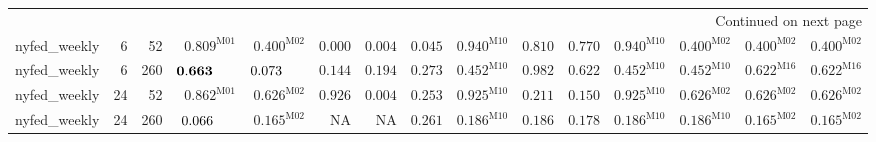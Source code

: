 \begin{longtable}{@{}lrrrrrrrrrrrrrr@{}}
\midrule
\endhead
\midrule\multicolumn{15}{r}{Continued on next page}\\\endfoot
\bottomrule\endlastfoot
nyfed\_weekly & 6 & 52 & $\mathbf{0.809}^{\mathrm{M01}}$ & $\mathbf{0.400}^{\mathrm{M02}}$ & $0.000$ & $0.004$ & $0.045$ & $\mathbf{0.940}^{\mathrm{M10}}$ & $\mathbf{0.810}$ & $\mathbf{0.770}$ & $\mathbf{0.940}^{\mathrm{M10}}$ & $\mathbf{0.400}^{\mathrm{M02}}$ & $\mathbf{0.400}^{\mathrm{M02}}$ & $\mathbf{0.400}^{\mathrm{M02}}$ \\
nyfed\_weekly & 6 & 260 & $\mathbf{0.663}\hphantom{^{\mathrm{M00}}}$ & $0.073\hphantom{^{\mathrm{M00}}}$ & $\mathbf{0.144}$ & $\mathbf{0.194}$ & $\mathbf{0.273}$ & $\mathbf{0.452}^{\mathrm{M10}}$ & $\mathbf{0.982}$ & $\mathbf{0.622}$ & $\mathbf{0.452}^{\mathrm{M10}}$ & $\mathbf{0.452}^{\mathrm{M10}}$ & $\mathbf{0.622}^{\mathrm{M16}}$ & $\mathbf{0.622}^{\mathrm{M16}}$ \\
nyfed\_weekly & 24 & 52 & $\mathbf{0.862}^{\mathrm{M01}}$ & $\mathbf{0.626}^{\mathrm{M02}}$ & $\mathbf{0.926}$ & $0.004$ & $\mathbf{0.253}$ & $\mathbf{0.925}^{\mathrm{M10}}$ & $\mathbf{0.211}$ & $\mathbf{0.150}$ & $\mathbf{0.925}^{\mathrm{M10}}$ & $\mathbf{0.626}^{\mathrm{M02}}$ & $\mathbf{0.626}^{\mathrm{M02}}$ & $\mathbf{0.626}^{\mathrm{M02}}$ \\
nyfed\_weekly & 24 & 260 & $0.066\hphantom{^{\mathrm{M00}}}$ & $\mathbf{0.165}^{\mathrm{M02}}$ & \textsc{NA} & \textsc{NA} & $\mathbf{0.261}$ & $\mathbf{0.186}^{\mathrm{M10}}$ & $\mathbf{0.186}$ & $\mathbf{0.178}$ & $\mathbf{0.186}^{\mathrm{M10}}$ & $\mathbf{0.186}^{\mathrm{M10}}$ & $\mathbf{0.165}^{\mathrm{M02}}$ & $\mathbf{0.165}^{\mathrm{M02}}$ \\
\end{longtable}

